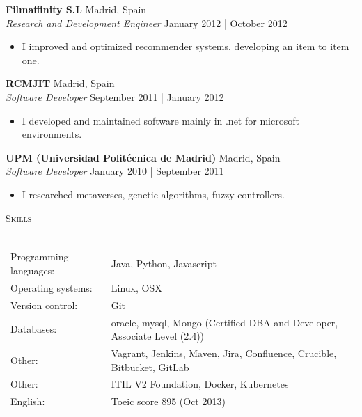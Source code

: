 \documentclass[a4paper]{article}
\newcommand{\lineunder} {
    \vspace*{-8pt} \\
    \hspace*{-18pt} \hrulefill \\
}
\newcommand{\header} [1] {
    {\hspace*{-18pt}\vspace*{6pt} \textsc{#1}}
    \vspace*{-6pt} \lineunder
}
\begin{document}
\textbf{Filmaffinity S.L} \hfill Madrid, Spain\\
\textit{Research and Development Engineer} \hfill January 2012 | October 2012\\
\vspace{-1mm}
\begin{itemize} \itemsep 1pt
	\item I improved and optimized recommender systems, developing an item to item one.
\end{itemize}

\textbf{RCMJIT} \hfill Madrid, Spain\\
\textit{Software Developer} \hfill September 2011 | January 2012\\
\vspace{-1mm}
\begin{itemize} \itemsep 1pt
	\item I developed and maintained software mainly in .net for microsoft environments.
\end{itemize}

\textbf{UPM (Universidad Politécnica de Madrid)} \hfill Madrid, Spain\\
\textit{Software Developer} \hfill January 2010 | September 2011\\
\vspace{-1mm}
\begin{itemize} \itemsep 1pt
	\item I researched metaverses, genetic algorithms, fuzzy controllers.
\end{itemize}

\header{Skills}
\begin{tabular}{ l l }
	Programming languages: & Java, Python, Javascript                                                  \\
	Operating systems:     & Linux, OSX                                                                \\
	Version control:       & Git                                                                       \\
	Databases:             & oracle, mysql, Mongo (Certified DBA and Developer, Associate Level (2.4)) \\
	Other:                 & Vagrant, Jenkins, Maven, Jira, Confluence, Crucible, Bitbucket, GitLab    \\
	Other:                 & ITIL V2 Foundation, Docker, Kubernetes                                    \\
	English:               & Toeic score 895 (Oct 2013)                                                \\
\end{tabular}
\end{document}
